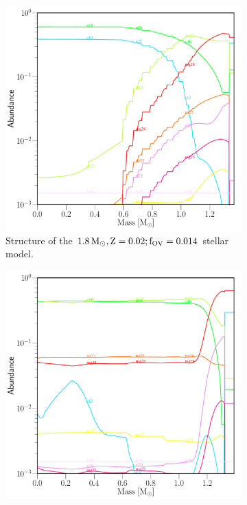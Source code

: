 \documentclass[../../main/thesis_msc.tex]{subfiles}
\begin{document}
\begin{figure}
\centering
\begin{subfigure}[b]{.45\linewidth}
\includegraphics[width=\textwidth]{../figures/chapter4/1p8_logRho9_abun.pdf}
\caption{Structure of the $\rm 1.8\, M_{\odot},  Z=0.02;f_{OV}=0.014$ stellar model.}\label{fig:abun_a}
\hfill
\end{subfigure}
\hfill
\begin{subfigure}[b]{.45\linewidth}
\includegraphics[width=\textwidth]{../figures/chapter4/2p5_logRho_9_abun.pdf}

\end{subfigure}
\end{figure}
\end{document}
